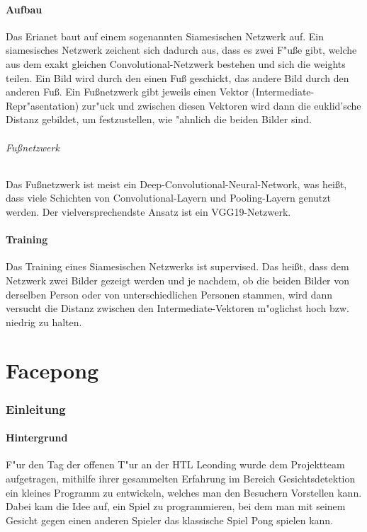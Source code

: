 \documentclass[12pt]{article}
\begin{document}
\subsection{Aufbau}
\label{neuralfoot}
Das Erianet baut auf einem sogenannten {\glqq}Siamesischen Netzwerk{\grqq} auf.
Ein siamesisches Netzwerk zeichent sich dadurch aus, dass es zwei
{\glqq}F"u{\ss}e{\grqq} gibt, welche aus dem exakt gleichen Convolutional-Netzwerk 
bestehen und sich die weights teilen. Ein Bild wird durch den
einen Fu{\ss} geschickt, das andere Bild durch den anderen Fu{\ss}.
Ein Fu{\ss}netzwerk gibt jeweils einen Vektor (Intermediate-Repr"asentation)
zur"uck und zwischen diesen Vektoren wird dann die euklid'sche Distanz
gebildet, um festzustellen, wie "ahnlich die beiden Bilder sind.
\paragraph{Fu{\ss}netzwerk}
Das Fu{\ss}netzwerk ist meist ein Deep-Convolutional-Neural-Network, was hei{\ss}t,
dass viele Schichten von Convolutional-Layern und Pooling-Layern genutzt werden.
Der vielversprechendste Ansatz ist ein VGG19-Netzwerk.
\subsection{Training}
Das Training eines Siamesischen Netzwerks ist supervised. Das hei{\ss}t, dass
dem Netzwerk zwei Bilder gezeigt werden und je nachdem, ob die beiden Bilder
von derselben Person oder von unterschiedlichen Personen stammen, wird dann 
versucht die Distanz zwischen den Intermediate-Vektoren m"oglichst hoch bzw. 
niedrig zu halten.

\part{Facepong}
\section{Einleitung}
\subsection{Hintergrund}
F"ur den Tag der offenen T"ur an der HTL Leonding wurde dem Projektteam
aufgetragen, mithilfe ihrer gesammelten Erfahrung im Bereich Gesichtsdetektion
ein kleines Programm zu entwickeln, welches man den Besuchern Vorstellen kann.
Dabei kam die Idee auf, ein Spiel zu programmieren, bei dem man mit seinem Gesicht
gegen einen anderen Spieler das klassische Spiel {\glqq}Pong{\grqq} spielen kann.
\end{document}
